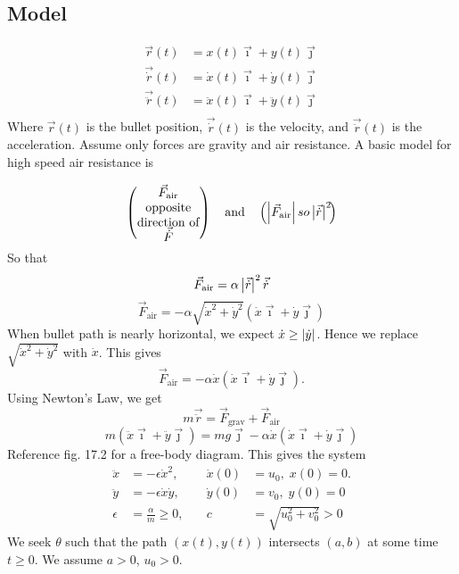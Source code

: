 \documentclass[12pt]{article}
\begin{document}
\subsection{Model}
\begin{equation*}
  \begin{aligned}
    \vec{r}(t) &= x(t)\vec{\imath} + y(t)\vec{\jmath} \\
    \vec{\dot{r}}(t) &= \dot{x}(t)\vec{\imath} + \dot{y}(t)\vec{\jmath} \\
    \vec{\ddot{r}}(t) &= \ddot{x}(t)\vec{\imath} + \ddot{y}(t)\vec{\jmath} \\
  \end{aligned}
\end{equation*}
Where $\vec{r}(t)$ is the bullet position, $\vec{\dot{r}}(t)$ is the velocity,
and $\vec{\ddot{r}}(t)$ is the acceleration. Assume only forces are gravity and
air resistance. A basic model for high speed air resistance is

\begin{equation}
  \left( \text{\parbox{5em}{\centering $\vec{F}_{\text{air}}$ opposite direction of $\vec{\dot{F}}$}}
  \right) \quad\text{and}\quad
  \left( \parbox{5em}{\centering \text{$\abs{\vec{F}_{\text{air}}} so \abs{\vec{\dot{r}}}^2$}} \right)
\end{equation}
So that
$$\vec{F}_{\text{air}} = \alpha\left|{\vec{\dot{r}}}\right|^2\vec{\dot{r}}$$
$$\vec{F}_{\text{air}} =
-\alpha\sqrt{\dot{x}^2+\dot{y}^2}(\dot{x}\vec{\imath}+\dot{y}\vec{\jmath})$$
When bullet path is nearly horizontal, we expect $\dot{x}\ge\left|{\dot{y}}\right|$.
Hence we replace $\sqrt{\dot{x}^2+\dot{y}^2}$ with $\dot{x}$. This gives
$$\vec{F}_{\text{air}} = -\alpha\dot{x}(\dot{x}\vec{\imath}+\dot{y}\vec{\jmath}).$$
Using Newton's Law, we get
$$m\vec{\ddot{r}} = \vec{F}_{\text{grav}} + \vec{F}_{\text{air}}$$
$$m(\ddot{x}\vec{\imath}+\ddot{y}\vec{\jmath}) = mg\vec{\jmath} -
\alpha\dot{x}(\dot{x}\vec{\imath}+\dot{y}\vec{\jmath})$$
Reference fig. 17.2 for a free-body diagram. This gives the system
\begin{equation}
  \label{eq:ballistic-system}
  \begin{aligned}
    \ddot{x} &= -\epsilon\dot{x}^2,&\quad \dot{x}(0)&=u_0,\;x(0)=0. \\
    \ddot{y} &= -\epsilon\dot{x}\dot{y},&\quad \dot{y}(0)&=v_0,\;y(0)=0 \\
    \epsilon &= \frac{\alpha}{m} \ge 0, &\quad c&=\sqrt{u_0^2+v_0^2}>0
  \end{aligned}
\end{equation}
We seek $\theta$ such that the path $(x(t), y(t))$ intersects $(a,b)$ at some
time $t\ge0$. We assume $a>0$, $u_0>0$.
\end{document}
